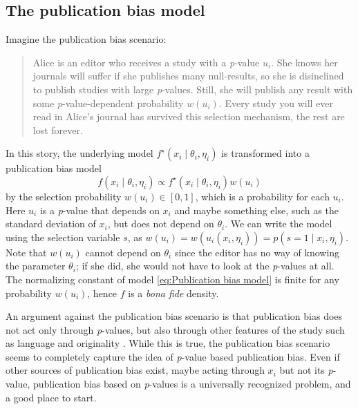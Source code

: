 \documentclass[useAMS,usenatbib,referee]{biom}
\begin{document}
\subsection{The publication bias model} \label{subsect:publicationBias}

Imagine the publication bias scenario:
\begin{quote}
Alice is an editor who receives a study with a \textit{p}-value $u_i$. She knows her journals will suffer if she publishes many null-results, so she is disinclined to publish studies with large \textit{p}-values. Still, she will publish any result with some \textit{p}-value-dependent probability $w(u_i)$. Every study you will ever read in Alice's journal has survived this selection mechanism, the rest are lost forever.
\end{quote}
In this story, the underlying model $f^{\star}(x_{i}\mid\theta_{i},\eta_{i})$ is transformed into a publication bias model
\vspace{-9mm}
\begin{equation}\label{eq:Publication bias model}
f(x_{i}\mid\theta_{i},\eta_{i})\propto f^{\star}(x_{i}\mid\theta_{i},\eta_{i})w(u_i)
\end{equation}
by the selection probability $w(u_i) \in [0,1]$, which is a probability for each $u_i$. Here $u_i$ is a \textit{p}-value that depends on $x_{i}$ and maybe something else, such as the standard deviation of $x_{i}$, but does not depend on $\theta_{i}$. We can write the model using the selection variable $s$, as $w(u_i) = w(u_i(x_i, \eta_i)) = p(s=1 \mid x_i, \eta_i)$. Note that $w(u_i)$ cannot depend on $\theta_{i}$ since the editor has no way of knowing the parameter $\theta_{i}$; if she did, she would not have to look at the \textit{p}-values at all. The normalizing constant of model \eqref{eq:Publication bias model} is finite for any probability $w(u_i)$, hence $f$ is a \textit{bona fide} density.

An argument against the publication bias scenario is that publication bias does not act only through \textit{p}-values, but also through other features of the study such as language \citep{egger1998meta}
and originality \citep{callaham1998positive}. While this is true, the publication bias scenario seems to completely capture the idea of \textit{p}-value based publication bias. Even if other sources of publication bias exist, maybe acting through $x_{i}$ but not its \textit{p}-value, publication bias based on \textit{p}-values is a universally recognized problem, and a good place to start.
\end{document}
